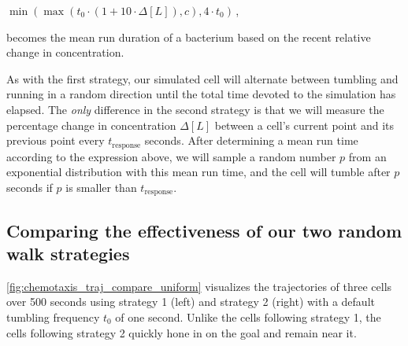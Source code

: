 \begin{center}
$\min\left(\max(t_0 \cdot (1 + 10 \cdot \Delta [L]), c), 4 \cdot t_0\right)$\,,
\end{center}

\noindent becomes the mean run duration of a bacterium based on the recent relative change in concentration.\\

\begin{qbox}\end{qbox}

As with the first strategy, our simulated cell will alternate between tumbling and running in a random direction until the total time devoted to the simulation has elapsed. The \textit{only} difference in the second strategy is that we will measure the percentage change in concentration $\Delta [L]$ between a cell's current point and its previous point every $t_{\text{response}}$ seconds. After determining a mean run time according to the expression above, we will sample a random number $p$ from an exponential distribution with this mean run time, and the cell will tumble after $p$ seconds if $p$ is smaller than $t_{\text{response}}$.

\FloatBarrier
{}
\subsection{Comparing the effectiveness of our two random walk strategies}

\autoref{fig:chemotaxis_traj_compare_uniform} visualizes the trajectories of three cells over 500 seconds using strategy 1 (left) and strategy 2 (right) with a default tumbling frequency $t_0$ of one second. Unlike the cells following strategy 1, the cells following strategy 2 quickly hone in on the goal and remain near it.\\

